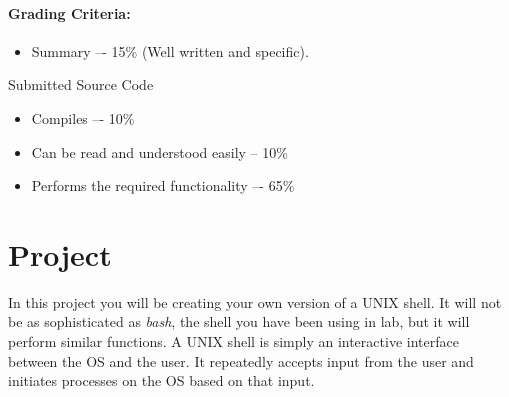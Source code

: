 \documentclass[letterpaper,10pt]{article}
\begin{document}
\paragraph{Grading Criteria:}
\begin{itemize}
 \item Summary –- 15\% (Well written and specific).
\end{itemize}

Submitted Source Code
\begin{itemize}
 \item Compiles –- 10\% 
 \item Can be read and understood easily -- 10\%
 \item Performs the required functionality –- 65\%
\end{itemize}

\section{Project}
In this project you will be creating your own version of a UNIX shell. It will not be as sophisticated as \emph{bash},
the shell you have been using in lab, but it will perform similar functions.
A UNIX shell is simply an interactive interface between the OS and the user.
It repeatedly accepts input from the user and initiates processes on the OS based on that input.
\end{document}

